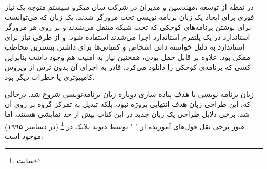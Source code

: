 \documentclass[a4paper,12pt]{report}
\begin{document}
	 در نقطه از توسعه 
	  ،مهندسین و مدیران در شرکت سان میکرو سیستم متوجه یک نیاز فوری برای ایجاد یک زبان برنامه نویسی تحت مرورگر  شدند، 
	 یک زبان که می‌توانست برای نوشتن برنامه‌های کوچکی که تحت شبکه متنقل می‌شدند و بر روی هر مرورگر استاندارد در یک پلتفرم استاندارد اجرا می‌شدند استفاده شود.
	و از طرفی نیاز برای استاندارد به دلیل خواسته ذاتی اشخاص و کمپانی‌ها برای داشتن بیشترین مخاطب ممکن بود. علاوه بر قابل حمل بودن، همچنین نیاز به امنیت هم وجود داشت بنابراین کسی که برنامه‌ی کوچکی را دانلود می‌کرد، قادر به اجرای آن بدون ترس از ویروس کامپیوتری یا خطرات دیگر بود.
	
	زبان برنامه نویسی
  با هدف پیاده سازی دوباره زبان برنامه‌نویسی 
  شروع شد. درحالی که، این طراحی زبان هدف انتهایی پروژه نبود، بلکه تبدیل به تمرکز گروه بر روی آن شد.
  برخی دلایل طراحی یک زبان جدید در این کتاب بیش از حد نمایشی هستند، اما هنوز برخی نقل قول‌های آموزنده از "
	"
  توسط دیوید بلانک در 
	\footnote{
  سایت
	}
	(در دسامبر ۱۹۹۵) موجود است:
\end{document}
